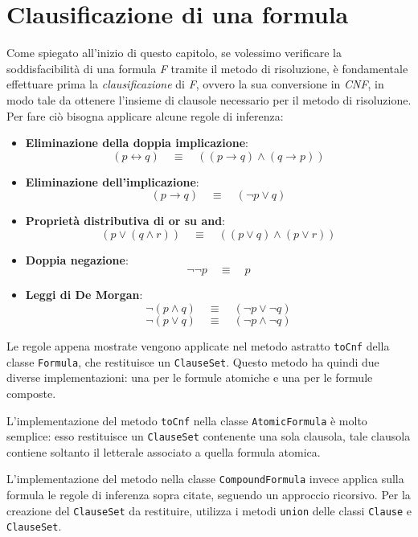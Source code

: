 \documentclass[a4paper,12pt]{report}
\newcommand{\tto} {\leftrightarrow}
\begin{document}
\section{Clausificazione di una formula}
\label{clausification}
Come spiegato all'inizio di questo capitolo, se volessimo verificare la soddisfacibilità di una formula \emph{F} tramite il metodo di risoluzione, è fondamentale effettuare prima la \emph{clausificazione} di \emph{F}, ovvero la sua conversione in \emph{CNF}, in modo tale da ottenere l'insieme di clausole necessario per il metodo di risoluzione. Per fare ciò bisogna applicare alcune regole di inferenza:
\begin{itemize}
    \item \textbf{Eliminazione della doppia implicazione}: 
    \[
    (p \tto q) \quad \equiv \quad ((p \to q) \land (q \to p))
    \]
    
    \item \textbf{Eliminazione dell'implicazione}: 
    \[
    (p \to q) \quad \equiv \quad (\lnot p \lor q)
    \]
    
    \item \textbf{Proprietà distributiva di or su and}:
    \[
    (p \lor (q \land r)) \quad \equiv \quad ((p \lor q) \land (p \lor r))
    \]
    
    \item \textbf{Doppia negazione}:
    \[
    \lnot\lnot p \quad \equiv \quad p
    \]
    
    \item \textbf{Leggi di De Morgan}:
    \[
    \lnot(p \land q) \quad \equiv \quad (\lnot p \lor \lnot q)
    \]
    \[
    \lnot(p \lor q) \quad \equiv \quad (\lnot p \land \lnot q)
    \]
\end{itemize}
Le regole appena mostrate vengono applicate nel metodo astratto \texttt{toCnf} della classe \texttt{Formula}, che restituisce un \texttt{ClauseSet}. Questo metodo ha quindi due diverse implementazioni: una per le formule atomiche e una per le formule composte.

L'implementazione del metodo \texttt{toCnf} nella classe \texttt{AtomicFormula} è molto semplice: esso restituisce un \texttt{ClauseSet} contenente una sola clausola, tale clausola contiene soltanto il letterale associato a quella formula atomica.
 
L'implementazione del metodo nella classe \texttt{CompoundFormula} invece applica sulla formula le regole di inferenza sopra citate, seguendo un approccio ricorsivo. Per la creazione del \texttt{ClauseSet} da restituire, utilizza i metodi \texttt{union} delle classi \texttt{Clause} e \texttt{ClauseSet}.
\end{document}
